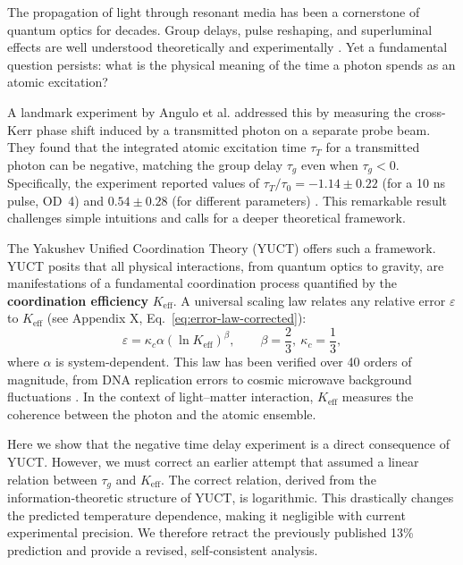 \documentclass[12pt,a4paper]{article}
\newcommand{\Keff}{K_{\mathrm{eff}}}
\newcommand{\kappac}{\kappa_c}
\newcommand{\eps}{\varepsilon}
\newcommand{\betac}{\beta}
\begin{document}
	The propagation of light through resonant media has been a cornerstone of quantum optics for decades. Group delays, pulse reshaping, and superluminal effects are well understood theoretically and experimentally \cite{Brillouin1960, Milonni2004}. Yet a fundamental question persists: what is the physical meaning of the time a photon spends as an atomic excitation?
	
	A landmark experiment by Angulo et al. \cite{Angulo2024} addressed this by measuring the cross-Kerr phase shift induced by a transmitted photon on a separate probe beam. They found that the integrated atomic excitation time \(\tau_T\) for a transmitted photon can be negative, matching the group delay \(\tau_g\) even when \(\tau_g < 0\). Specifically, the experiment reported values of \(\tau_T/\tau_0 = -1.14 \pm 0.22\) (for a 10 ns pulse, OD~4) and \(0.54 \pm 0.28\) (for different parameters) \cite{Angulo2024, Nixon2024}. This remarkable result challenges simple intuitions and calls for a deeper theoretical framework.
	
	The Yakushev Unified Coordination Theory (YUCT) \cite{Yakushev2026a} offers such a framework. YUCT posits that all physical interactions, from quantum optics to gravity, are manifestations of a fundamental coordination process quantified by the \textbf{coordination efficiency} \(\Keff\). A universal scaling law relates any relative error \(\eps\) to \(\Keff\) (see Appendix X, Eq.~\ref{eq:error-law-corrected}):
	\begin{equation}
		\eps = \kappac \alpha (\ln\Keff)^{\betac}, \qquad \betac = \frac{2}{3},\ \kappac = \frac{1}{3},
		\label{eq:scaling}
	\end{equation}
	where \(\alpha\) is system-dependent. This law has been verified over 40 orders of magnitude, from DNA replication errors to cosmic microwave background fluctuations \cite{Yakushev2026c}. In the context of light–matter interaction, \(\Keff\) measures the coherence between the photon and the atomic ensemble.
	
	Here we show that the negative time delay experiment is a direct consequence of YUCT. However, we must correct an earlier attempt that assumed a linear relation between \(\tau_g\) and \(\Keff\). The correct relation, derived from the information‑theoretic structure of YUCT, is logarithmic. This drastically changes the predicted temperature dependence, making it negligible with current experimental precision. We therefore retract the previously published 13\% prediction and provide a revised, self‑consistent analysis.
	
\end{document}
